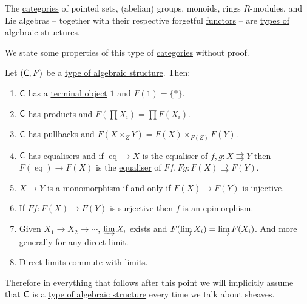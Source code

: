 \documentclass[../../main]{subfiles}
\begin{document}
\begin{example}
  The \hyperref[def:category]{categories} of pointed sets, (abelian) groups, monoids, rings \(R\)-modules, and Lie algebras -- together with their respective forgetful \hyperref[def:functor]{functors} -- are \hyperref[def:algebraic-structure]{types of algebraic structures}.
\end{example}

We state some properties of this type of \hyperref[def:category]{categories} without proof.
\begin{lemma}\label{lemma:algebraic-structure-properties}
  Let \((\mathsf{C}, F)\) be a \hyperref[def:algebraic-structure]{type of algebraic structure}. Then:
  \begin{enumerate}
    \item \(\mathsf{C}\) has a \hyperref[def:initial-terminal-object]{terminal object} \(1\) and \(F(1) = \{\ast\}\).
    \item \(\mathsf{C}\) has \hyperref[def:categorical-product]{products} and \(F \left( \prod X_{i} \right) = \prod F \left( X_{i} \right)\).
    \item \(\mathsf{C}\) has \hyperref[def:pullback]{pullbacks} and \(F(X \times_{Z} Y) = F(X) \times_{F(Z)} F(Y)\).
    \item \(\mathsf{C}\) has \hyperref[def:equaliser]{equalisers} and if \(\operatorname{eq} \to X\) is the \hyperref[def:equaliser]{equaliser} of \(f, g\colon X \rightrightarrows Y\) then \(F(\operatorname{eq}) \to F(X)\) is the \hyperref[def:equaliser]{equaliser} of \(Ff, Fg\colon F(X) \rightrightarrows F(Y)\).
    \item \(X \to Y\) is a \hyperref[def:mono-epi-morphism]{monomorphism} if and only if \(F(X) \to F(Y)\) is injective.
    \item If \(Ff\colon F(X) \to F(Y)\) is surjective then \(f\) is an \hyperref[def:mono-epi-morphism]{epimorphism}.
    \item Given \(X_{1} \to X_{2} \to \cdots\), \(\varinjlim X_{i}\) exists and \(F(\varinjlim X_{i}) = \varinjlim F(X_{i})\). And more generally for any \hyperref[def:direct-limit]{direct limit}.
    \item \hyperref[def:direct-limit]{Direct limits} commute with \hyperref[def:categorical-limit]{limits}.
  \end{enumerate}
\end{lemma}

Therefore in everything that follows after this point we will implicitly assume that \(\mathsf{C}\) is a \hyperref[def:algebraic-structure]{type of algebraic structure} every time we talk about sheaves.
\end{document}
